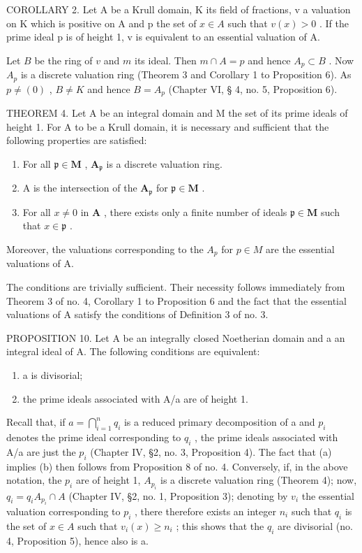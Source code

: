 COROLLARY 2. Let A be a Krull domain, K its field of fractions, v a valuation on K which is positive on A and p the set of \(x \in A\) such that \(v(x) > 0\) . If the prime ideal p is of height 1, v is equivalent to an essential valuation of A.

Let \(B\) be the ring of \(v\) and \(m\) its ideal. Then \(m \cap A = p\) and hence \(A_p \subset B\) . Now \(A_p\) is a discrete valuation ring (Theorem 3 and Corollary 1 to Proposition 6). As \(p \neq (0)\) , \(B \neq K\) and hence \(B = A_p\) (Chapter VI, § 4, no. 5, Proposition 6).

THEOREM 4. Let A be an integral domain and M the set of its prime ideals of height 1. For A to be a Krull domain, it is necessary and sufficient that the following properties are satisfied:

\begin{enumerate}
\def\labelenumi{(\roman{enumi})}
\item
  For all \(\mathfrak{p} \in \mathbf{M}\) , \(\mathbf{A}_{\mathfrak{p}}\) is a discrete valuation ring.
\item
  A is the intersection of the \(\mathbf{A}_{\mathfrak{p}}\) for \(\mathfrak{p} \in \mathbf{M}\) .
\item
  For all \(x \neq 0\) in \(\mathbf{A}\) , there exists only a finite number of ideals \(\mathfrak{p} \in \mathbf{M}\) such that \(x \in \mathfrak{p}\) .
\end{enumerate}

Moreover, the valuations corresponding to the \(A_{p}\) for \(p \in M\) are the essential valuations of A.

The conditions are trivially sufficient. Their necessity follows immediately from Theorem 3 of no. 4, Corollary 1 to Proposition 6 and the fact that the essential valuations of A satisfy the conditions of Definition 3 of no. 3.

PROPOSITION 10. Let A be an integrally closed Noetherian domain and a an integral ideal of A. The following conditions are equivalent:

\begin{enumerate}
\def\labelenumi{(\alph{enumi})}
\item
  a is divisorial;
\item
  the prime ideals associated with A/a are of height 1.
\end{enumerate}

Recall that, if \(a = \bigcap_{i=1}^{n} q_i\) is a reduced primary decomposition of a and \(p_i\) denotes the prime ideal corresponding to \(q_i\) , the prime ideals associated with A/a are just the \(p_i\) (Chapter IV, §2, no. 3, Proposition 4). The fact that (a) implies (b) then follows from Proposition 8 of no. 4. Conversely, if, in the above notation, the \(p_i\) are of height 1, \(A_{p_i}\) is a discrete valuation ring (Theorem 4); now, \(q_i = q_i A_{p_i} \cap A\) (Chapter IV, §2, no. 1, Proposition 3); denoting by \(v_i\) the essential valuation corresponding to \(p_i\) , there therefore exists an integer \(n_i\) such that \(q_i\) is the set of \(x \in A\) such that \(v_i(x) \geqslant n_i\) ; this shows that the \(q_i\) are divisorial (no. 4, Proposition 5), hence also is a.

